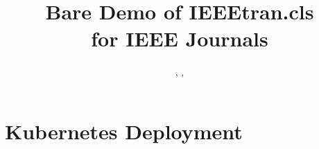 \documentclass[journal]{IEEEtran}
\begin{document}


\title{Bare Demo of IEEEtran.cls\\ for IEEE Journals}

\author{
  \authorOne,
  \authorTwo,
  \authorThree
}



\maketitle











\newpage
\appendices
\section{Kubernetes Deployment} \label{appendix:php_apache}


\end{document}
